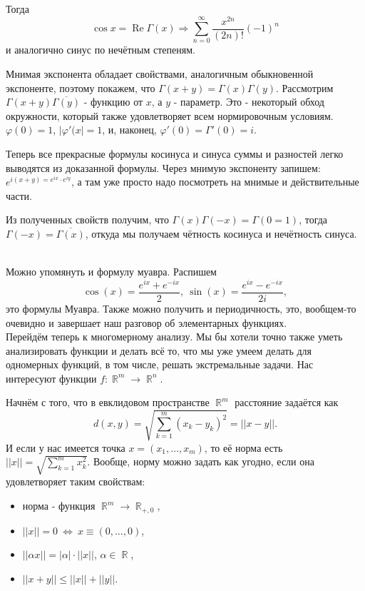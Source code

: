 \documentclass[a4paper,100pt]{article}
\theoremstyle{indented}
\theoremstyle{definition}
\theoremstyle{remark}
\DeclareMathOperator{\Real}{Re}
\DeclareMathOperator{\RR}{\mathbb{R}}
\begin{document}
Тогда 
\[
    \cos x = \Real \Gamma(x) \Rightarrow \sum_{n=0}^\infty\frac{x^{2n}}{(2n)!}(-1)^n
\]
и аналогично синус по нечётным степеням. \ 

Мнимая экспонента обладает свойствами, аналогичным обыкновенной экспоненте, поэтому покажем, что $\Gamma(x+y)=\Gamma(x)\Gamma(y)$. Рассмотрим $\Gamma(x+y)\overline{\Gamma(y)}$ - функцию от $x$, а $y$ - параметр. Это - некоторый обход окружности, который также удовлетворяет всем нормировочным условиям. $\varphi(0)=1$, $|\varphi'(x|=1$, и, наконец, $\varphi'(0)=\Gamma'(0)= i$. \ 

Теперь все прекрасные формулы косинуса и синуса суммы и разностей легко выводятся из доказанной формулы. Через мнимую экспоненту запишем: $e^{i(x+y)=e^{ix}\cdot e^{iy}}$, а там уже просто надо посмотреть на мнимые и действительные части. \ 

Из полученных свойств получим, что $\Gamma(x)\Gamma(-x)=\Gamma(0=1)$, тогда $\Gamma(-x)=\overline{\Gamma(x)}$, откуда мы получаем чётность косинуса и нечётность синуса. \ 

Можно упомянуть и формулу муавра. Распишем 
\[
    \cos(x)=\frac{e^{ix}+e^{-ix}}{2}, \: \sin(x)=\frac{e^{ix}-e^{-ix}}{2i}, 
\]
это формулы Муавра. Также можно получить и периодичность, это, вообщем-то очевидно и завершает наш разговор об элементарных функциях. \\

Перейдём теперь к многомерному анализу. Мы бы хотели точно также уметь анализировать функции и делать всё то, что мы уже умеем делать для одномерных функций, в том числе, решать экстремальные задачи. Нас интересуют функции $f:\RR^m\rightarrow \RR^n$. \ 

Начнём с того, что в евклидовом пространстве $\RR^m$ расстояние задаётся как 
\[
    d(x, y)=\sqrt{\sum_{k=1}^m(x_k-y_k)^2}=||x-y||.
\]
И если у нас имеется точка $x=(x_1, \ldots, x_m)$, то её норма есть $||x||=\sqrt{\sum_{k=1}^mx_k^2}$. Вообще, норму можно задать как угодно, если она удовлетворяет таким свойствам: 

\begin{itemize}
    \item норма - функция $\RR^m\rightarrow \RR_{+, 0}$, 
    \item $||x||=0 \: \Leftrightarrow \: x\equiv (0,\ldots, 0)$, 
    \item $||\alpha x||=|\alpha|\cdot||x||$, $\alpha\in \RR$, 
    \item $||x+y||\leq ||x||+||y||$. 
\end{itemize}
\end{document}

